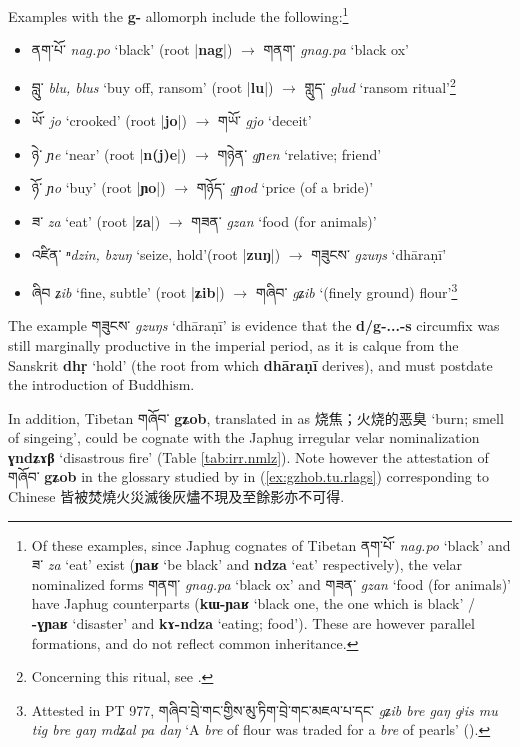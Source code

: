 \documentclass[oneside,a4paper,11pt]{article}
\newcommand{\ipa}[1]{\textbf{{\phon\mbox{#1}}}} %
\newcommand{\zh}[1]{{\cn #1}}
\newcommand{\tibet}[3]{{\tibetain#1} \textit{\phon#2} `#3'}
\newcommand{\tibetan}[1]{{\tibetain#1}}
\newcommand{\dhat}[1]{|\ipa{#1}|}
\begin{document}
Examples with the \ipa{g-} allomorph include the following:\footnote{Of these examples, since Japhug cognates of Tibetan   \tibet{ནག་པོ་}{nag.po}{black} and   \tibet{ཟ་}{za}{eat} exist (\ipa{ɲaʁ} `be black' and \ipa{ndza} `eat' respectively), the velar nominalized forms  \tibet{གནག་}{gnag.pa}{black ox} 	and  \tibet{གཟན་}{gzan}{food (for animals)} have Japhug counterparts (\ipa{kɯ-ɲaʁ} `black one, the one which is black' / \ipa{-ɣɲaʁ}   `disaster' and \ipa{kɤ-ndza} `eating; food'). These are however parallel formations, and do not reflect common inheritance. }

\begin{itemize}
\item \tibet{ནག་པོ་}{nag.po}{black} (root \dhat{nag}) $\rightarrow$	\tibet{གནག་}{gnag.pa}{black ox} 	
\item \tibet{བླུ་}{blu, blus}{buy off, ransom} (root \dhat{lu}) $\rightarrow$	\tibet{གླུད་}{glud}{ransom ritual}\footnote{Concerning this ritual, see \citet{karmay91glud}.}
\item \tibet{ཡོ་}{jo}{crooked} (root \dhat{jo}) $\rightarrow$	\tibet{གཡོ་}{gjo}{deceit}
\item \tibet{ཉེ་}{ɲe}{near} (root \dhat{n(j)e}) $\rightarrow$	\tibet{གཉེན་}{gɲen}{relative; friend}
\item \tibet{ཉོ་}{ɲo}{buy} (root \dhat{ɲo}) $\rightarrow$ \tibet{གཉོད་}{gɲod}{price (of a bride)}
\item \tibet{ཟ་}{za}{eat} (root \dhat{za}) $\rightarrow$	 \tibet{གཟན་}{gzan}{food (for animals)}
\item \tibet{འཛིན་}{ⁿdzin, bzuŋ}{seize, hold}(root \dhat{zuŋ}) $\rightarrow$	\tibet{གཟུངས་}{gzuŋs}{dhāraṇī}
\item \tibet{ཞིབ}{ʑib}{fine, subtle} (root \dhat{ʑib}) $\rightarrow$	\tibet{གཞིབ་}{gʑib}{(finely ground) flour}\footnote{Attested in PT 977, \tibet{གཞིབ་བྲེ་གང་གྱིས་མུ་ཏིག་བྲེ་གང་མཇལ་པ་དང་}{gʑib bre gaŋ gʲis mu tig bre gaŋ mdʑal pa daŋ}{A \textit{bre} of flour was traded for a \textit{bre} of pearls} (\citealt[430]{silk18pt977}). }
\end{itemize}
 
 The example \tibet{གཟུངས་}{gzuŋs}{dhāraṇī} is evidence that the \ipa{d/g-...-s} circumfix was still marginally productive in the imperial period, as it is calque from the Sanskrit \ipa{dhṛ} `hold' (the root from which \ipa{dhāraṇī} derives),  and must postdate the introduction of Buddhism.
 
In addition, Tibetan \tibetan{གཞོབ་} \ipa{gʑob}, translated in \citet{bodrgya} as \zh{烧焦；火烧的恶臭} `burn; smell of singeing', could be cognate with the Japhug irregular velar nominalization \ipa{ɣndʑɤβ}  `disastrous fire' (Table \ref{tab:irr.nmlz}). Note however the attestation of \tibetan{གཞོབ་} \ipa{gʑob}  in the glossary studied by \citet{lifk62glossary} in (\ref{ex:gzhob.tu.rlags}) corresponding to Chinese \zh{皆被焚燒火災滅後灰燼不現及至餘影亦不可得}. 
\end{document}
